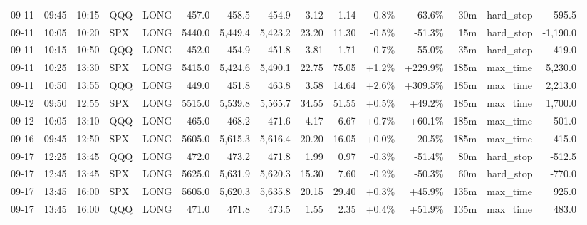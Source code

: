 \documentclass[11pt,a4paper,twoside]{article}
\begin{document}
\begin{landscape}
\begin{center}
\begin{longtable}{>{\color{txtmain}}l l l l l r r r r r r r r >{\color{txtmain}}l r}
09-11 & 09:45 & 10:15 & QQQ & LONG & 457.0 & 458.5 & 454.9 & 3.12 & 1.14 & \textcolor{lossred}{-0.8\%} & \textcolor{lossred}{-63.6\%} & 30m & hard\_stop & \textcolor{lossred}{-595.5} \\
09-11 & 10:05 & 10:20 & SPX & LONG & 5440.0 & 5,449.4 & 5,423.2 & 23.20 & 11.30 & \textcolor{lossred}{-0.5\%} & \textcolor{lossred}{-51.3\%} & 15m & hard\_stop & \textcolor{lossred}{-1,190.0} \\
09-11 & 10:15 & 10:50 & QQQ & LONG & 452.0 & 454.9 & 451.8 & 3.81 & 1.71 & \textcolor{lossred}{-0.7\%} & \textcolor{lossred}{-55.0\%} & 35m & hard\_stop & \textcolor{lossred}{-419.0} \\
09-11 & 10:25 & 13:30 & SPX & LONG & 5415.0 & 5,424.6 & 5,490.1 & 22.75 & 75.05 & \textcolor{wingreen}{+1.2\%} & \textcolor{wingreen}{+229.9\%} & 185m & max\_time & \textcolor{wingreen}{5,230.0} \\
09-11 & 10:50 & 13:55 & QQQ & LONG & 449.0 & 451.8 & 463.8 & 3.58 & 14.64 & \textcolor{wingreen}{+2.6\%} & \textcolor{wingreen}{+309.5\%} & 185m & max\_time & \textcolor{wingreen}{2,213.0} \\
09-12 & 09:50 & 12:55 & SPX & LONG & 5515.0 & 5,539.8 & 5,565.7 & 34.55 & 51.55 & \textcolor{wingreen}{+0.5\%} & \textcolor{wingreen}{+49.2\%} & 185m & max\_time & \textcolor{wingreen}{1,700.0} \\
09-12 & 10:05 & 13:10 & QQQ & LONG & 465.0 & 468.2 & 471.6 & 4.17 & 6.67 & \textcolor{wingreen}{+0.7\%} & \textcolor{wingreen}{+60.1\%} & 185m & max\_time & \textcolor{wingreen}{501.0} \\
09-16 & 09:45 & 12:50 & SPX & LONG & 5605.0 & 5,615.3 & 5,616.4 & 20.20 & 16.05 & \textcolor{wingreen}{+0.0\%} & \textcolor{lossred}{-20.5\%} & 185m & max\_time & \textcolor{lossred}{-415.0} \\
09-17 & 12:25 & 13:45 & QQQ & LONG & 472.0 & 473.2 & 471.8 & 1.99 & 0.97 & \textcolor{lossred}{-0.3\%} & \textcolor{lossred}{-51.4\%} & 80m & hard\_stop & \textcolor{lossred}{-512.5} \\
09-17 & 12:45 & 13:45 & SPX & LONG & 5625.0 & 5,631.9 & 5,620.3 & 15.30 & 7.60 & \textcolor{lossred}{-0.2\%} & \textcolor{lossred}{-50.3\%} & 60m & hard\_stop & \textcolor{lossred}{-770.0} \\
09-17 & 13:45 & 16:00 & SPX & LONG & 5605.0 & 5,620.3 & 5,635.8 & 20.15 & 29.40 & \textcolor{wingreen}{+0.3\%} & \textcolor{wingreen}{+45.9\%} & 135m & max\_time & \textcolor{wingreen}{925.0} \\
09-17 & 13:45 & 16:00 & QQQ & LONG & 471.0 & 471.8 & 473.5 & 1.55 & 2.35 & \textcolor{wingreen}{+0.4\%} & \textcolor{wingreen}{+51.9\%} & 135m & max\_time & \textcolor{wingreen}{483.0} \\

\end{longtable}
\end{center}
\end{landscape}
\end{document}
